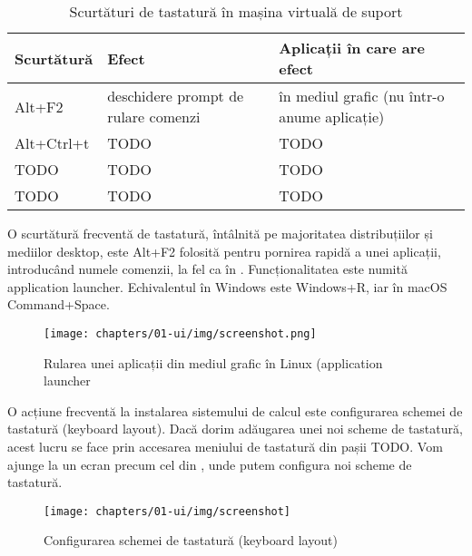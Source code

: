 \begin{table}[!htb]
  \caption{Scurtături de tastatură în mașina virtuală de suport}
  \begin{center}
    \begin{tabular}{ p{} p{} p{} }
      \toprule
        \textbf{Scurtătură} &
        \textbf{Efect} &
        \textbf{Aplicații în care are efect} \\
      \midrule
        Alt+F2 &
        deschidere prompt de rulare comenzi &
        în mediul grafic (nu într-o anume aplicație) \\

        Alt+Ctrl+t &
        TODO &
        TODO \\

        TODO &
        TODO &
        TODO \\

        TODO &
        TODO &
        TODO \\

      \bottomrule
    \end{tabular}
    \label{tab:ui:vm-shortcuts}
  \end{center}
\end{table}

O scurtătură frecventă de tastatură, întâlnită pe majoritatea distribuțiilor și mediilor desktop, este Alt+F2 folosită pentru pornirea rapidă a unei aplicații, introducând numele comenzii, la fel ca în . Funcționalitatea este numită application launcher. Echivalentul în Windows este Windows+R, iar în macOS Command+Space.

\begin{figure}[!htbp]
  \centering
  \texttt{[image: chapters/01-ui/img/screenshot.png]}
  \caption{Rularea unei aplicații din mediul grafic în Linux (application launcher}
  \label{fig:ui:app-launcher}
\end{figure}

O acțiune frecventă la instalarea sistemului de calcul este configurarea schemei de tastatură (keyboard layout). Dacă dorim adăugarea unei noi scheme de tastatură, acest lucru se face prin accesarea meniului de tastatură din pașii TODO. Vom ajunge la un ecran precum cel din , unde putem configura noi scheme de tastatură.

\begin{figure}[!htbp]
  \centering
  \texttt{[image: chapters/01-ui/img/screenshot]}
  \caption{Configurarea schemei de tastatură (keyboard layout)}
  \label{fig:ui:keyboard-layout}
\end{figure}

